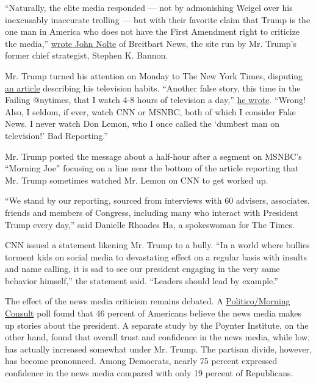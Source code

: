 ``Naturally, the elite media responded --- not by admonishing Weigel
over his inexcusably inaccurate trolling --- but with their favorite
claim that Trump is the one man in America who does not have the First
Amendment right to criticize the media,''
\href{http://www.breitbart.com/big-journalism/2017/12/10/trump-blasts-wapos-dave-weigel-reporter-heckles-fake-photo/}{wrote
John Nolte} of Breitbart News, the site run by Mr. Trump's former chief
strategist, Stephen K. Bannon.

Mr. Trump turned his attention on Monday to The New York Times,
disputing
\href{https://www.nytimes3xbfgragh.onion/2017/12/09/us/politics/donald-trump-president.html}{an
article} describing his television habits. ``Another false story, this
time in the Failing @nytimes, that I watch 4-8 hours of television a
day,''
\href{https://twitter.com/realDonaldTrump/status/940223974985871360}{he
wrote}. ``Wrong! Also, I seldom, if ever, watch CNN or MSNBC, both of
which I consider Fake News. I never watch Don Lemon, who I once called
the `dumbest man on television!' Bad Reporting.''

Mr. Trump posted the message about a half-hour after a segment on
MSNBC's ``Morning Joe'' focusing on a line near the bottom of the
article reporting that Mr. Trump sometimes watched Mr. Lemon on CNN to
get worked up.

``We stand by our reporting, sourced from interviews with 60 advisers,
associates, friends and members of Congress, including many who interact
with President Trump every day,'' said Danielle Rhoades Ha, a
spokeswoman for The Times.

CNN issued a statement likening Mr. Trump to a bully. ``In a world where
bullies torment kids on social media to devastating effect on a regular
basis with insults and name calling, it is sad to see our president
engaging in the very same behavior himself,'' the statement said.
``Leaders should lead by example.''

The effect of the news media criticism remains debated. A
\href{https://www.politico.com/story/2017/10/18/trump-media-fake-news-poll-243884}{Politico/Morning
Consult} poll found that 46 percent of Americans believe the news media
makes up stories about the president. A separate study by the Poynter
Institute, on the other hand, found that overall trust and confidence in
the news media, while low, has actually increased somewhat under Mr.
Trump. The partisan divide, however, has become pronounced. Among
Democrats, nearly 75 percent expressed confidence in the news media
compared with only 19 percent of Republicans.

